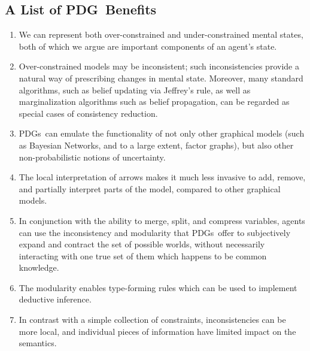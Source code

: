 \documentclass{article}
\newcommand{\MN}{PDG}
\newcommand{\MNs}{\MN s}
\begin{document}
	\subsection{A List of \MN\ Benefits}\label{sec:list-of-benefits}
	\begin{enumerate}[nosep]
		\item We can represent both over-constrained and under-constrained mental states, both of which we argue are important components of an agent's state.
		\item Over-constrained models may be inconsistent; such inconsistencies provide a natural way of prescribing changes in mental state. Moreover, many standard algorithms, such as belief updating via Jeffrey's rule, as well as marginalization algorithms such as belief propagation, can be regarded as special cases of consistency reduction.
		\item \MNs\ can emulate the functionality of not only other graphical models (such as Bayesian Networks, and to a large extent, factor graphs), but also other non-probabilistic notions of uncertainty.
		\item The local interpretation of arrows makes it much less invasive to add, remove, and partially interpret parts of the model, compared to other graphical models.
		\item In conjunction with the ability to merge, split, and compress variables, agents can use the inconsistency and modularity that \MNs\ offer to subjectively expand and contract the set of possible worlds, without necessarily interacting with one true set of them which happens to be common knowledge. %
		\item The modularity enables type-forming rules which can be used to implement deductive inference.
		\item In contrast with a simple collection of constraints, inconsistencies can be more local, and individual pieces of information have limited impact on the semantics.
	\end{enumerate} %

	\printbibliography
	
	\onecolumn
	\appendix
\end{document}
